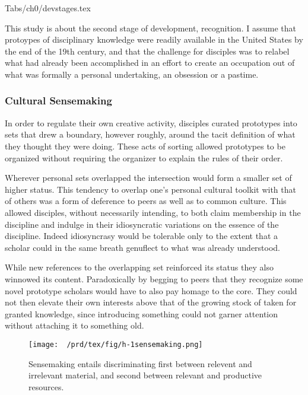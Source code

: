 \documentclass [PhD] {uclathes}
\begin{document}
Tabs/ch0/devstages.tex

This study is about the second stage of development, recognition. I
assume that protoypes of disciplinary knowledge were readily available
in the United States by the end of the 19th century, and that the
challenge for disciples was to relabel what had already been
accomplished in an effort to create an occupation out of what was
formally a personal undertaking, an obsession or a pastime.

\subsubsection{Cultural Sensemaking}\label{cultural-sensemaking}

In order to regulate their own creative activity, disciples curated
prototypes into sets that drew a boundary, however roughly, around the
tacit definition of what they thought they were doing. These acts of
sorting allowed prototypes to be organized without requiring the
organizer to explain the rules of their order.

Wherever personal sets overlapped the intersection would form a smaller
set of higher status. This tendency to overlap one's personal cultural
toolkit with that of others was a form of deference to peers as well as
to common culture. This allowed disciples, without necessarily
intending, to both claim membership in the discipline and indulge in
their idiosyncratic variations on the essence of the discipline. Indeed
idiosyncrasy would be tolerable only to the extent that a scholar could
in the same breath genuflect to what was already understood.

While new references to the overlapping set reinforced its status they
also winnowed its content. Paradoxically by begging to peers that they
recognize some novel prototype scholars would have to also pay homage to
the core. They could not then elevate their own interests above that of
the growing stock of taken for granted knowledge, since introducing
something could not garner attention without attaching it to something
old.

\begin{figure}[htbp]
\centering
\texttt{[image: ~/prd/tex/fig/h-1sensemaking.png]}
\caption{Sensemaking entails discriminating first between relevent and
irrelevant material, and second between relevant and productive
resources.}
\end{figure}
\end{document}
